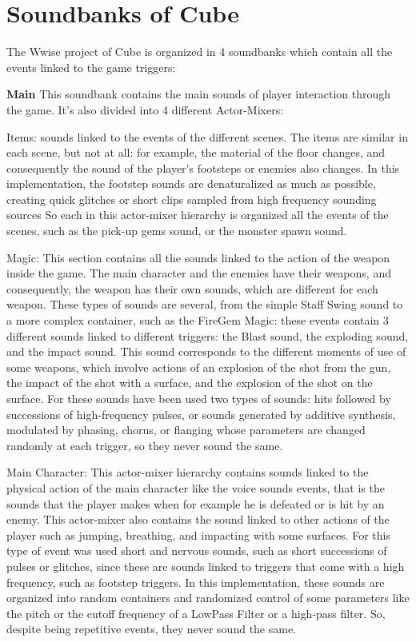 \section{Soundbanks of Cube}
The Wwise project of Cube is organized in 4 soundbanks which contain all the events linked to the game triggers:
	
	\begin{compactitem}
		\item \textbf{Main} This soundbank contains the main sounds of player interaction through the game. It's also divided into 4 different Actor-Mixers:
			\begin{compactitem}
				\item Items: sounds linked to the events of the different scenes. The items are similar in each scene, but not at all: for example, the material of the floor changes, and consequently the sound of the player's footsteps or enemies also changes.
				In this implementation, the footstep sounds are denaturalized as much as possible, creating quick glitches or short clips sampled from high frequency sounding sources
				So each in this actor-mixer hierarchy is organized all the events of the scenes, such as the pick-up gems sound, or the monster spawn sound.
				
				\item Magic: This section contains all the sounds linked to the action of the weapon inside the game. The main character and the enemies have their weapons, and consequently, the weapon has their own sounds, which are different for each weapon. These types of sounds are several, from the simple Staff Swing sound to a more complex container, such as the FireGem Magic: these events contain 3 different sounds linked to different triggers: the Blast sound, the exploding sound, and the impact sound. This sound corresponds to the different moments of use of some weapons, which involve actions of an explosion of the shot from the gun, the impact of the shot with a surface, and the explosion of the shot on the surface.
				For these sounds have been used two types of sounds: hits followed by successions of high-frequency pulses, or sounds generated by additive synthesis, modulated by phasing, chorus, or flanging whose parameters are changed randomly at each trigger, so they never sound the same.
				
				\item Main Character: This actor-mixer hierarchy contains sounds linked to the physical action of the main character like the voice sounds events, that is the sounds that the player makes when for example he is defeated or is hit by an enemy. This actor-mixer also contains the sound linked to other actions of the player such as jumping, breathing, and impacting with some surfaces.
				For this type of event was used short and nervous sounds, such as short successions of pulses or glitches, since these are sounds linked to triggers that come with a high frequency, such as footstep triggers.
				In this implementation, these sounds are organized into random containers and randomized control of some parameters like the pitch or the cutoff frequency of a LowPass Filter or a high-pass filter. So, despite being repetitive events, they never sound the same.
				

\end{compactitem}
\end{compactitem}
